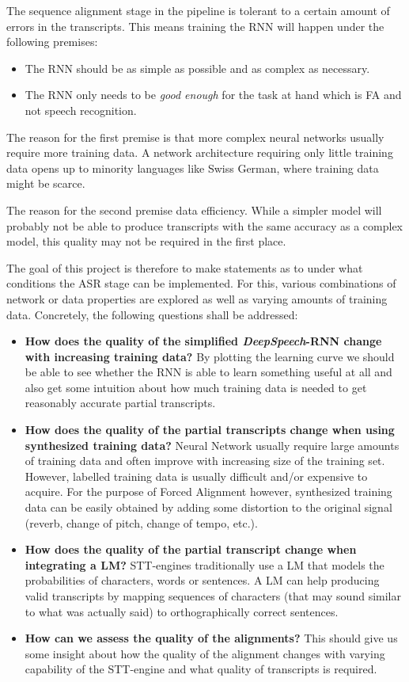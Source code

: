 The sequence alignment stage in the pipeline is tolerant to a certain amount of errors in the transcripts. This means training the \ac{RNN} will happen under the following premises:

\begin{itemize}
	\item The \ac{RNN} should be as simple as possible and as complex as necessary.
	\item The \ac{RNN} only needs to be \textit{good enough} for the task at hand which is \ac{FA} and not speech recognition.	
\end{itemize}

The reason for the first premise is that more complex neural networks usually require more training data. A network architecture requiring only little training data opens up to minority languages like Swiss German, where training data might be scarce.

The reason for the second premise data efficiency. While a simpler model will probably not be able to produce transcripts with the same accuracy as a complex model, this quality may not be required in the first place. 

The goal of this project is therefore to make statements as to under what conditions the \ac{ASR} stage can be implemented. For this, various combinations of network or data properties are explored as well as varying amounts of training data. Concretely, the following questions shall be addressed:

\begin{itemize}
	\item \textbf{How does the quality of the simplified \textit{DeepSpeech}-\ac{RNN} change with increasing training data?} By plotting the learning curve we should be able to see whether the RNN is able to learn something useful at all and also get some intuition about how much training data is needed to get reasonably accurate partial transcripts.
	\item \textbf{How does the quality of the partial transcripts change when using synthesized training data?} Neural Network usually require large amounts of training data and often improve with increasing size of the training set. However, labelled training data is usually difficult and/or expensive to acquire. For the purpose of Forced Alignment however, synthesized training data can be easily obtained by adding some distortion to the original signal (reverb, change of pitch, change of tempo, etc.).
	\item \textbf{How does the quality of the partial transcript change when integrating a \ac{LM}?} \ac{STT}-engines traditionally use a \ac{LM} that models the probabilities of characters, words or sentences. A \ac{LM} can help producing valid transcripts by mapping sequences of characters (that may sound similar to what was actually said) to orthographically correct sentences.
	\item \textbf{How can we assess the quality of the alignments?} This should give us some insight about how the quality of the alignment changes with varying capability of the \ac{STT}-engine and what quality of transcripts is required.
\end{itemize}

